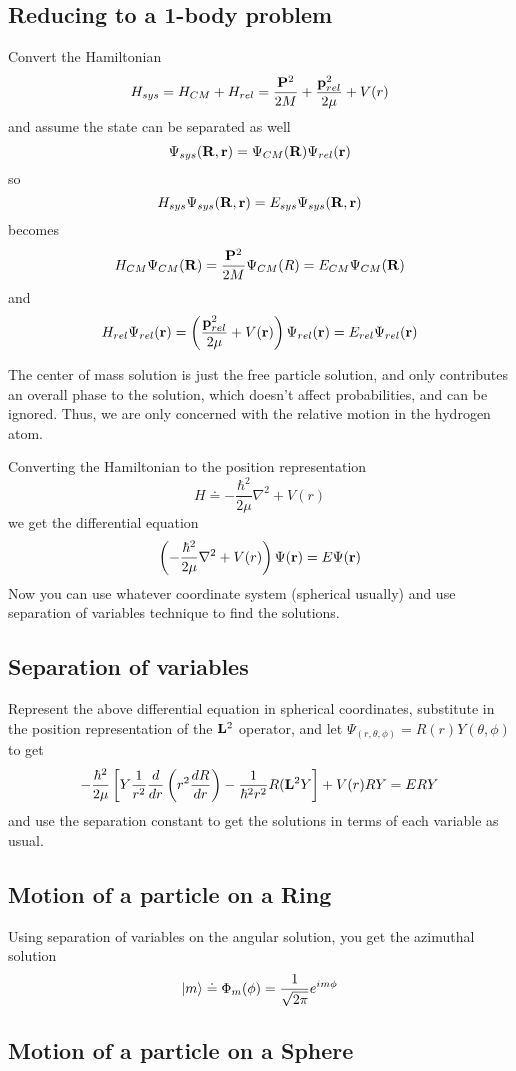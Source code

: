 \documentclass{article}
\begin{document}
\subsection{Reducing to a 1-body problem}
Convert the Hamiltonian
$$
H_{sys} = H_{CM} + H_{rel} = \frac{\vb{P}^2}{2M} + \frac{\vb{p}_{rel}^{2}}{2\mu} + V(r)
$$ 
and assume the state can be separated as well 
$$
\Psi_{sys}(\vb{R},\vb{r}) = \Psi_{CM}(\vb{R}) \Psi_{rel}(\vb{r})
$$
so 
$$
H_{sys}\Psi_{sys}(\vb{R},\vb{r}) = E_{sys}\Psi_{sys}(\vb{R}, \vb{r})
$$
becomes
$$
H_{CM}\Psi_{CM}(\vb{R}) = \frac{\vb{P}^2}{2M} \Psi_{CM}(R) = E_{CM} \Psi_{CM}(\vb{R})
$$
and 
$$
H_{rel}\Psi_{rel}(\vb{r}) = \left( \frac{\vb{p}_{rel}^2}{2\mu} + V(\vb{r}) \right) \Psi_{rel}(\vb{r}) = E_{rel}\Psi_{rel}(\vb{r})
$$

The center of mass solution is just the free particle solution, and only contributes an overall phase to the solution, which doesn't affect probabilities, and can be ignored.  Thus, we are only concerned with the relative motion in the hydrogen atom.

Converting the Hamiltonian to the position representation
$$
H \doteq - \frac{\hbar^2}{2\mu} \nabla^2 + V(r)
$$
we get the differential equation
$$
\left( -\frac{\hbar^2}{2\mu} \nabla^2 + V(r) \right) \Psi(\vb{r}) = E \Psi(\vb{r})
$$
Now you can use whatever coordinate system (spherical usually) and use separation of variables technique to find the solutions.

\subsection{Separation of variables}
Represent the above differential equation in spherical coordinates, substitute in the position representation of the $\vb{L}^2$ operator, and let $\Psi_(r,\theta,\phi) = R(r) Y(\theta,\phi)$
to get 
$$
-\frac{\hbar^2}{2\mu} \left[ Y\frac{1}{r^2} \frac{d}{dr}\left(r^2\frac{dR}{dr} \right) - \frac{1}{\hbar^2 r^2} R(\vb{L}^2Y \right] + V(r)RY = ERY
$$
and use the separation constant to get the solutions in terms of each variable as usual.

\subsection{Motion of a particle on a Ring}
Using separation of variables on the angular solution, you get the azimuthal solution
$$
\ket{m} \doteq \Phi_m(\phi) = \frac{1}{\sqrt{2\pi}}e^{im\phi}
$$

\subsection{Motion of a particle on a Sphere}
\end{document}
